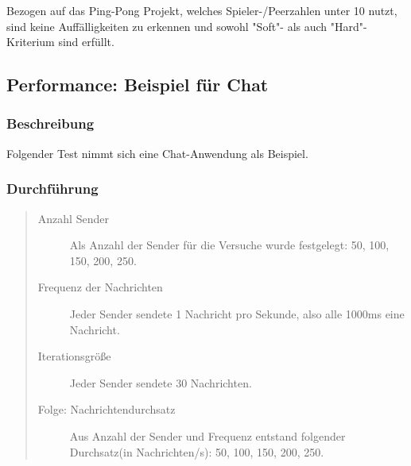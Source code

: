 Bezogen auf das Ping-Pong Projekt, welches Spieler-/Peerzahlen unter 10 nutzt, sind keine Auffälligkeiten zu erkennen und sowohl "Soft"- als auch "Hard"-Kriterium sind erfüllt.




\subsection{Performance: Beispiel für Chat}

\subsubsection{Beschreibung}
Folgender Test nimmt sich eine Chat-Anwendung als Beispiel.



\subsubsection{Durchführung}
\begin{quote}
  \begin{description}
  \item[Anzahl Sender]
  Als Anzahl der Sender für die Versuche wurde festgelegt: 50, 100, 150, 200, 250.

  \item[Frequenz der Nachrichten]
  Jeder Sender sendete 1 Nachricht pro Sekunde, also alle 1000ms eine Nachricht.

  \item[Iterationsgröße]
  Jeder Sender sendete 30 Nachrichten.

  \item[Folge: Nachrichtendurchsatz]
  Aus Anzahl der Sender und Frequenz entstand folgender Durchsatz(in Nachrichten/s): 50, 100, 150, 200, 250.
  \end{description}
\end{quote}



